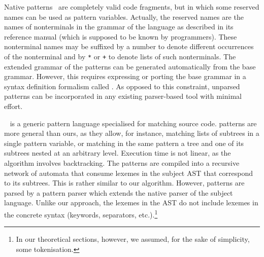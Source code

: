 Native patterns~\cite{native} are completely valid code fragments, but
in which some reserved names can be used as pattern
variables. Actually, the reserved names are the names of
non\-terminals in the grammar of the language as described in its
reference manual (which is supposed to be known by programmers). These
non\-terminal names may be suffixed by a number to denote different
occurrences of the nonterminal and by \texttt{*} or \texttt{+} to
denote lists of such nonterminals. The extended grammar of the
patterns can be generated automatically from the base
grammar. However, this requires expressing or porting the base grammar
in a syntax definition formalism called \SDF. As opposed to this
constraint, unparsed patterns can be incorporated in any existing
parser\hyp{}based tool with minimal effort.

\Scruple~\cite{scruple} is a generic pattern language specialised for
matching source code. \Scruple patterns are more general than ours, as
they allow, for instance, matching lists of subtrees in a single
pattern variable, or matching in the same pattern a tree and one of
its subtrees nested at an arbitrary level. Execution time is not
linear, as the algorithm involves backtracking. The patterns are
compiled into a recursive network of automata that consume lexemes in
the subject AST that correspond to its subtrees. This is rather
similar to our algorithm. However, \Scruple patterns are parsed by a
pattern parser which extends the native parser of the subject
language. Unlike our approach, the lexemes in the AST do not include
lexemes in the concrete syntax (keywords, separators,
etc.).\footnote{In our theoretical sections, however, we assumed, for
the sake of simplicity, some tokenisation.}

